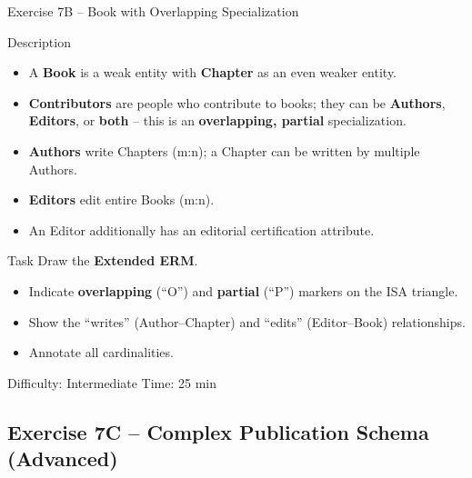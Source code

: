 \documentclass[10pt]{beamer}
\begin{document}
\begin{frame}{Exercise 7B -- Book with Overlapping Specialization}
  \begin{block}{Description}
    \begin{itemize}
      \item A \textbf{Book} is a weak entity with \textbf{Chapter} as an even weaker entity.
      \item \textbf{Contributors} are people who contribute to books; they can be \textbf{Authors}, \textbf{Editors}, or \textbf{both} -- this is an \textbf{overlapping, partial} specialization.
      \item \textbf{Authors} write Chapters (m:n); a Chapter can be written by multiple Authors.
      \item \textbf{Editors} edit entire Books (m:n).
      \item An Editor additionally has an editorial certification attribute.
    \end{itemize}
  \end{block}

  \begin{block}{Task}
    Draw the \textbf{Extended ERM}.
    \begin{itemize}
      \item Indicate \textbf{overlapping} (``O'') and \textbf{partial} (``P'') markers on the ISA triangle.
      \item Show the ``writes'' (Author--Chapter) and ``edits'' (Editor--Book) relationships.
      \item Annotate all cardinalities.
    \end{itemize}
  \end{block}

  \begin{alertblock}{Difficulty: Intermediate \quad Time: 25 min}
  \end{alertblock}
\end{frame}

\subsection{Exercise 7C -- Complex Publication Schema (Advanced)}
\end{document}
